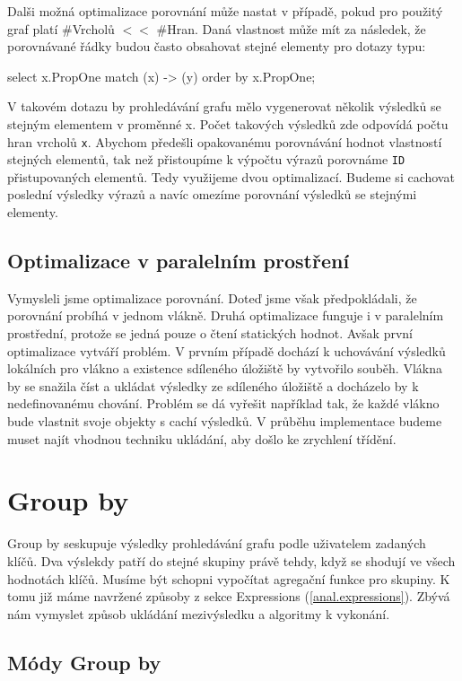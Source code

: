 Dalši možná optimalizace porovnání může nastat v případě, pokud pro použitý graf platí \#Vrcholů $<<$ \#Hran.
Daná vlastnost může mít za následek, že porovnávané řádky budou často obsahovat stejné elementy pro dotazy typu:
\begin{code}
select x.PropOne match (x) -> (y) order by x.PropOne;
\end{code}
V takovém dotazu by prohledávání grafu mělo vygenerovat několik výsledků se stejným elementem v proměnné x.
Počet takových výsledků zde odpovídá počtu hran vrcholů \texttt{x}.
Abychom předešli opakovanému porovnávání hodnot vlastností stejných elementů, tak než přistoupíme k výpočtu výrazů porovnáme \texttt{ID} přistupovaných elementů.
Tedy využijeme dvou optimalizací.
Budeme si cachovat poslední výsledky výrazů a navíc omezíme porovnání výsledků se stejnými elementy.

\subsection{Optimalizace v paralelním prostření}

Vymysleli jsme optimalizace porovnání.
Doteď jsme však předpokládali, že porovnání probíhá v jednom vlákně.
Druhá optimalizace funguje i v paralelním prostřední, protože se jedná pouze o čtení statických hodnot.
Avšak první optimalizace vytváří problém.
V prvním případě dochází k uchovávání výsledků lokálních pro vlákno a existence sdíleného úložiště by vytvořilo souběh.
Vlákna by se snažila číst a ukládat výsledky ze sdíleného úložiště a docházelo by k nedefinovanému chování.
Problém se dá vyřešit například tak, že každé vlákno bude vlastnit svoje objekty s cachí výsledků.
V průběhu implementace budeme muset najít vhodnou techniku ukládání, aby došlo ke zrychlení třídění.

\section{Group by} \label{anal.groupby}

Group by seskupuje výsledky prohledávání grafu podle uživatelem zadaných klíčů.
Dva výslekdy patří do stejné skupiny právě tehdy, když se shodují ve všech hodnotách klíčů.
Musíme být schopni vypočítat agregační funkce pro skupiny.
K tomu již máme navržené způsoby z sekce Expressions (\ref{anal.expressions}).
Zbývá nám vymyslet způsob ukládání mezivýsledku a algoritmy k vykonání.

\subsection{Módy Group by}

